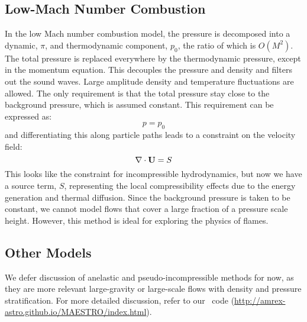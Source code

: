 \subsection{Low-Mach Number Combustion}

In the low Mach number combustion model, the pressure is decomposed
into a dynamic, $\pi$, and thermodynamic component, $p_0$, the ratio
of which is $O(M^2)$. The total pressure is replaced everywhere by the
thermodynamic pressure, except in the momentum equation. This
decouples the pressure and density and filters out the sound
waves. Large amplitude density and temperature fluctuations are
allowed. The only requirement is that the total pressure stay close to
the background pressure, which is assumed constant. This requirement
can be expressed as:
\begin{equation}
p = p_0
\end{equation}
and differentiating this along particle paths leads to a constraint on
the velocity field: 
\begin{equation}
\nabla \cdot {\bf U} = S 
\end{equation}
This looks like the constraint for incompressible hydrodynamics, but
now we have a source term, $S$, representing the local compressibility
effects due to the energy generation and thermal diffusion.  Since the
background pressure is taken to be constant, we cannot model flows
that cover a large fraction of a pressure scale height. However, this
method is ideal for exploring the physics of flames.

\subsection{Other Models}
We defer discussion of anelastic and pseudo-incompressible methods for now,
as they are more relevant large-gravity or large-scale flows with 
density and pressure stratification.  For more detailed discussion,
refer to our \maestro\ code
(\url{http://amrex-astro.github.io/MAESTRO/index.html}).



